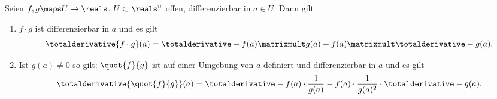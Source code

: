 \begin{satz}
    Seien \( f,g\maps U\to \reals \), \( U\subset \reals^n \) offen, differenzierbar in \( a\in U \). Dann gilt
    \begin{enumerate}
        \item \label{produktregel} \( f\cdot g \) ist differenzierbar in \( a \) und es gilt
        \begin{align*}
            \totalderivative{f\cdot g}(a)=\totalderivative-{f}(a)\matrixmult g(a)+f(a)\matrixmult \totalderivative-{g}(a).
        \end{align*}
        \item \label{quotientenregel} Ist \( g(a)\neq 0 \) so gilt: \( \quot{f}{g} \) ist auf einer Umgebung von \( a \) definiert und differenzierbar in \( a \) und es gilt 
        \begin{align*}
            \totalderivative{\quot{f}{g}}(a)=\totalderivative-{f}(a)\cdot\frac{1}{g(a)}-f(a)\cdot\frac{1}{g(a)^2}\cdot \totalderivative-{g}(a).
        \end{align*}
    \end{enumerate}
    
\end{satz}
